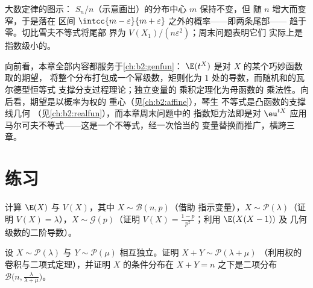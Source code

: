 \begin{omfigure}

{\small 大数定律的图示：
$S_n/n$（示意画出）的分布中心 $m$ 保持不变，但
随 $n$ 增大而变窄，于是落在
区间 $\intcc{m-\varepsilon}{m+\varepsilon}$ 之外的概率——即两条尾部——
趋于零。切比雪夫不等式将尾部
界为 $V(X_1)/(n\varepsilon^2)$；周末问题表明它们
实际上是指数级小的。}
\end{omfigure}

\begin{remark}[本册中的视角]
向前看，本章全部内容都服务于\cref{ch:b2:genfun}：
$\E(t^X)$ 是对 $X$ 的某个巧妙函数取的期望，
将整个分布打包成一个幂级数，矩则化为
 $1$ 处的导数，而随机和的瓦尔德型恒等式
支撑分支过程理论；独立变量的
乘积定理化为母函数的
乘法性。向后看，期望是以概率为权的
重心（见\cref{ch:b2:affine}），琴生
不等式是凸函数的支撑线几何
（见\cref{ch:b2:realfun}），而本章周末问题中的
指数矩方法即是对
 $\eu^{tX}$ 应用马尔可夫不等式——这是一个不等式，经一次恰当的
变量替换而推广，横跨三章。
\end{remark}

\section{练习}

\begin{exercise}[$\star$]\label{exo:b2:randomvar:1}
计算 $\E(X)$ 与 $V(X)$，其中 $X \sim \mathcal{B}(n, p)$（借助
指示变量），$X \sim \mathcal{P}(\lambda)$（证明 $V(X) =
\lambda$），$X \sim \mathcal{G}(p)$（证明 $V(X) =
\frac{1-p}{p^2}$；利用 $\E(X(X-1))$ 及
几何级数的二阶导数）。
\end{exercise}

\begin{exercise}[$\star$]\label{exo:b2:randomvar:2}
设 $X \sim \mathcal{P}(\lambda)$ 与 $Y \sim \mathcal{P}(\mu)$
相互独立。证明 $X + Y \sim \mathcal{P}(\lambda + \mu)$
（利用权的卷积与二项式定理），并证明
$X$ 的条件分布在 $X + Y = n$ 之下是二项分布
$\mathcal{B}\bigl(n, \frac{\lambda}{\lambda + \mu}\bigr)$。
\end{exercise}

